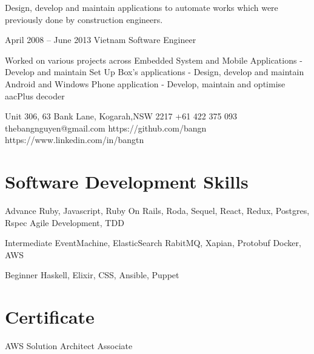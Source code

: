 \documentclass{tccv}
\begin{document}
\begin{eventlist}
    Design, develop and maintain applications to automate works which were previously done by construction engineers.

\item{April 2008 -- June 2013}
    {Vietnam}
    {Software Engineer}

    Worked on various projects across Embedded System and Mobile Applications
    \newline - Develop and maintain Set Up Box's applications
    \newline - Design, develop and maintain Android and Windows Phone application
    \newline - Develop, maintain and optimise aacPlus decoder

\end{eventlist}

\personal
    {Unit 306, 63 Bank Lane, Kogarah,\newline NSW 2217}
    {+61 422 375 093}
    {thebangnguyen@gmail.com}
    {https://github.com/bangn}
    {https://www.linkedin.com/in/bangtn}

\section{Software Development Skills}

\begin{factlist}

\item{Advance}
    {Ruby, Javascript, Ruby On Rails, Roda, Sequel, React, Redux, Postgres, Rspec
    \newline Agile Development, TDD}

\item{Intermediate}
    {EventMachine, ElasticSearch
    \newline RabitMQ, Xapian, Protobuf
    \newline Docker, AWS}

\item{Beginner}
    {Haskell, Elixir, CSS, Ansible, Puppet}
\end{factlist}

\section{Certificate}

\begin{factlist}

\item{AWS Solution Architect}
    {Associate}

\end{factlist}
\end{document}
